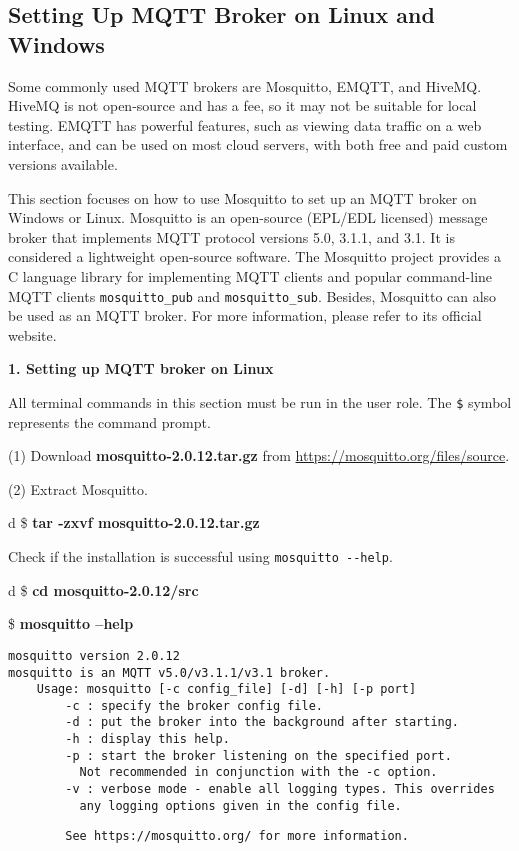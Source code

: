 \documentclass[a4paper,12pt]{book}
\begin{document}
\subsection{Setting Up MQTT Broker on Linux and Windows}
Some commonly used MQTT brokers are Mosquitto, EMQTT, and HiveMQ. HiveMQ is not open-source and has a fee, so it may not be suitable for local testing. EMQTT has powerful features, such as viewing data traffic on a web interface, and can be used on most cloud servers, with both free and paid custom versions available.

This section focuses on how to use Mosquitto to set up an MQTT broker on Windows or Linux. Mosquitto is an open-source (EPL/EDL licensed) message broker that implements MQTT protocol versions 5.0, 3.1.1, and 3.1. It is considered a lightweight open-source software. The Mosquitto project provides a C language library for implementing MQTT clients and popular command-line MQTT clients \verb|mosquitto_pub| and \verb|mosquitto_sub|. Besides, Mosquitto can also be used as an MQTT broker. For more information, please refer to its official website.

\textbf{1. Setting up MQTT broker on Linux}

All terminal commands in this section must be run in the user role. The \verb|$| symbol represents the command prompt.

(1) Download \textbf{mosquitto-2.0.12.tar.gz} from \url{https://mosquitto.org/files/source}.

(2)	Extract Mosquitto.

\begin{codebloc}
\begin{tabular}{d}
\$ \textbf{tar -zxvf mosquitto-2.0.12.tar.gz}
\end{tabular}
\end{codebloc}

Check if the installation is successful using \verb|mosquitto --help|.

\begin{codebloc}
\begin{tabular}{d}
\$ \textbf{cd mosquitto-2.0.12/src}

\$ \textbf{mosquitto --help}
\begin{verbatim}
mosquitto version 2.0.12
mosquitto is an MQTT v5.0/v3.1.1/v3.1 broker. 
    Usage: mosquitto [-c config_file] [-d] [-h] [-p port]
        -c : specify the broker config file.
        -d : put the broker into the background after starting.
        -h : display this help.
        -p : start the broker listening on the specified port.
          Not recommended in conjunction with the -c option.
        -v : verbose mode - enable all logging types. This overrides
          any logging options given in the config file.
\end{verbatim}
\verb|        See https://mosquitto.org/ for more information.|
\end{tabular}
\end{codebloc}
\end{document}
